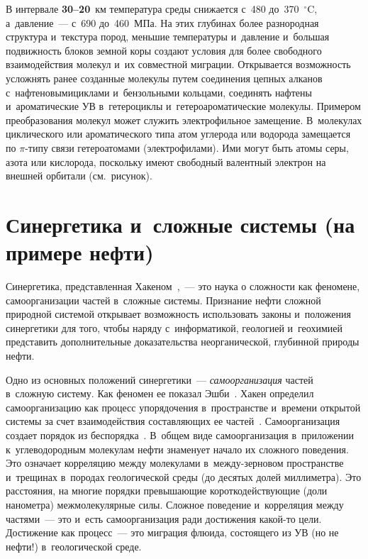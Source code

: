\begin{multicols}{2}
    В интервале \textbf{30--20}~км температура среды снижается с~480 
    до~370~$^\circ$C, а~давление~--- с~690 до~460~МПа. На этих глубинах более разнородная 
структура и~текстура пород, меньшие температуры и~давление и~большая 
подвижность блоков земной коры создают условия для более свободного 
взаимодействия молекул и~их совместной миграции. Открывается возможность 
усложнять ранее созданные молекулы путем соединения цепных алканов 
с~нафтеновыми\linebreak циклами и~бензольными кольцами, соединять нафтены 
и~ароматические УВ в~гетероциклы и~гетероароматические молекулы. Примером 
преобразования молекул может служить электрофильное \mbox{замещение}. 
В~молекулах циклического или ароматического типа атом углерода или водорода 
замещается по $\pi$-ти\-пу связи гетероатомами (электрофилами). Ими могут 
быть атомы серы, азота или кислорода, поскольку имеют свободный валентный 
электрон на внешней орбитали (см.\ рисунок).

\vspace*{-6pt}
    
\section{Синергетика и~сложные системы (на примере нефти)}

    Синергетика, представленная Хакеном~\cite{9-s},~--- это наука о сложности 
как феномене, самоорганизации частей в~сложные системы. Признание нефти 
сложной природной системой открывает возможность использовать законы 
и~положения синергетики для того, чтобы наряду с~информатикой, геологией 
и~геохимией представить дополнительные доказательства неорганической, 
глубинной природы нефти.
    
    Одно из основных положений синергетики~--- \textit{самоорганизация} 
частей в~сложную систему. Как феномен ее показал Эшби~\cite{10-s}. Хакен 
определил самоорганизацию как процесс упорядочения в~пространстве и~времени 
открытой системы за счет взаимодействия составляющих ее 
частей~\cite[с.~147]{11-s}.  
Самоорганизация создает порядок из беспорядка~\cite[с.~235--240]{12-s}. 
В~общем виде самоорганизация в~приложении к~углеводородным мо\-ле\-ку\-лам нефти 
знаменует начало их сложного поведения. Это означает корреляцию между 
молекулами в~между-зерновом пространстве и~трещинах в~породах геологической 
среды (до десятых долей миллиметра). Это расстояния, на многие порядки 
превышающие короткодействующие (доли нанометра) межмолекулярные силы. 
Сложное поведение и~корреляция между частями~--- это и~есть самоорганизация 
ради достижения какой-то цели. Достижение как процесс~--- это миграция 
флюида, состоящего из УВ (но не нефти!) в~геологической среде. 
    

\end{multicols}
